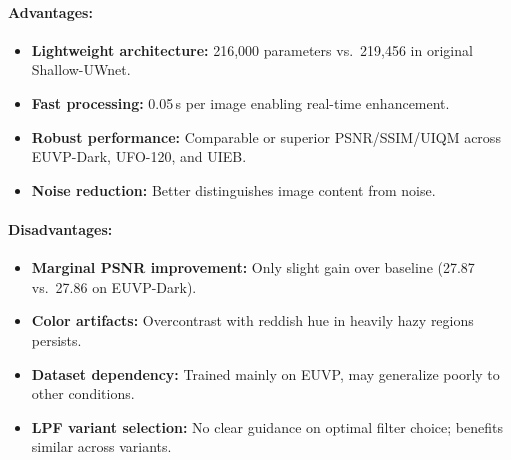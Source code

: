 \paragraph{Advantages:}
\begin{itemize}
    \item \textbf{Lightweight architecture:} 216,000 parameters vs.\ 219,456 in original Shallow-UWnet.
    \item \textbf{Fast processing:} 0.05\,s per image enabling real-time enhancement.
    \item \textbf{Robust performance:} Comparable or superior PSNR/SSIM/UIQM across EUVP-Dark, UFO-120, and UIEB.
    \item \textbf{Noise reduction:} Better distinguishes image content from noise.
\end{itemize}

\paragraph{Disadvantages:}
\begin{itemize}
    \item \textbf{Marginal PSNR improvement:} Only slight gain over baseline (27.87 vs.\ 27.86 on EUVP-Dark).
    \item \textbf{Color artifacts:} Overcontrast with reddish hue in heavily hazy regions persists.
    \item \textbf{Dataset dependency:} Trained mainly on EUVP, may generalize poorly to other conditions.
    \item \textbf{LPF variant selection:} No clear guidance on optimal filter choice; benefits similar across variants.
\end{itemize}

